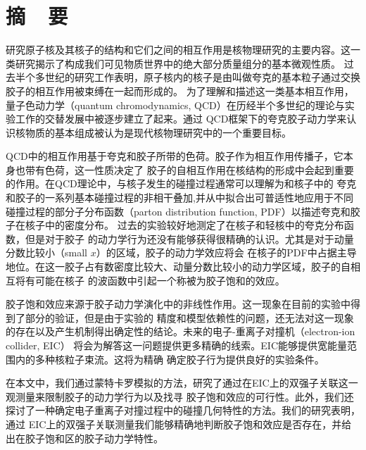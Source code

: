 
\chapter*{\LARGE  \bfseries {摘\ \ 要} }


\qquad 研究原子核及其核子的结构和它们之间的相互作用是核物理研究的主要内容。这一类研究揭示了构成我们可见物质世界中的绝大部分质量组分的基本微观性质。
过去半个多世纪的研究工作表明，原子核内的核子是由叫做夸克的基本粒子通过交换胶子的相互作用被束缚在一起而形成的。
为了理解和描述这一类基本相互作用，量子色动力学（quantum chromodynamics,
QCD）在历经半个多世纪的理论与实验工作的交替发展中被逐步建立了起来。通过
QCD框架下的夸克胶子动力学来认识核物质的基本组成被认为是现代核物理研究中的一个重要目标。

QCD中的相互作用基于夸克和胶子所带的色荷。胶子作为相互作用传播子，它本身也带有色荷，这一性质决定了
胶子的自相互作用在核结构的形成中会起到重要的作用。在QCD理论中，与核子发生的碰撞过程通常可以理解为和核子中的
夸克和胶子的一系列基本碰撞过程的非相干叠加,并从中拟合出可普适性地应用于不同碰撞过程的部分子分布函数（parton distribution function,
PDF）以描述夸克和胶子在核子中的密度分布。 过去的实验较好地测定了在核子和轻核中的夸克分布函数，但是对于胶子
的动力学行为还没有能够获得很精确的认识。尤其是对于动量分数比较小（small $x$）的区域，胶子的动力学效应将会
在核子的PDF中占据主导地位。在这一胶子占有数密度比较大、动量分数比较小的动力学区域，胶子的自相互将有可能在核子 的波函数中引起一个称被为胶子饱和的效应。

胶子饱和效应来源于胶子动力学演化中的非线性作用。这一现象在目前的实验中得到了部分的验证，但是由于实验的
精度和模型依赖性的问题，还无法对这一现象的存在以及产生机制得出确定性的结论。未来的电子-重离子对撞机（electron-ion collider, EIC）
将会为解答这一问题提供更多精确的线索。EIC能够提供宽能量范围内的多种核粒子束流。这将为精确 确定胶子行为提供良好的实验条件。

在本文中，我们通过蒙特卡罗模拟的方法，研究了通过在EIC上的双强子关联这一观测量来限制胶子的动力学行为以及找寻
胶子饱和效应的可行性。此外，我们还探讨了一种确定电子重离子对撞过程中的碰撞几何特性的方法。我们的研究表明，通过
EIC上的双强子关联测量我们能够精确地判断胶子饱和效应是否存在，并给出在胶子饱和区的胶子动力学特性。


